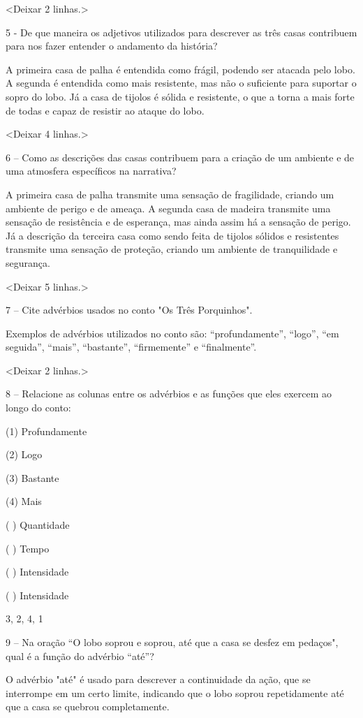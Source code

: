 \textless{}Deixar 2 linhas.\textgreater{}

5 - De que maneira os adjetivos utilizados para descrever as três casas
contribuem para nos fazer entender o andamento da história?

A primeira casa de palha é entendida como frágil, podendo ser atacada
pelo lobo. A segunda é entendida como mais resistente, mas não o
suficiente para suportar o sopro do lobo. Já a casa de tijolos é sólida
e resistente, o que a torna a mais forte de todas e capaz de resistir ao
ataque do lobo.

\textless{}Deixar 4 linhas.\textgreater{}

6 -- Como as descrições das casas contribuem para a criação de um
ambiente e de uma atmosfera específicos na narrativa?

A primeira casa de palha transmite uma sensação de fragilidade, criando
um ambiente de perigo e de ameaça. A segunda casa de madeira transmite
uma sensação de resistência e de esperança, mas ainda assim há a
sensação de perigo. Já a descrição da terceira casa como sendo feita de
tijolos sólidos e resistentes transmite uma sensação de proteção,
criando um ambiente de tranquilidade e segurança.

\textless{}Deixar 5 linhas.\textgreater{}

7 -- Cite advérbios usados no conto "Os Três Porquinhos".

Exemplos de advérbios utilizados no conto são: ``profundamente'',
``logo'', ``em seguida'', ``mais'', ``bastante'', ``firmemente'' e
``finalmente''.

\textless{}Deixar 2 linhas.\textgreater{}

8 -- Relacione as colunas entre os advérbios e as funções que eles
exercem ao longo do conto:

(1) Profundamente

(2) Logo

(3) Bastante

(4) Mais

( ) Quantidade

( ) Tempo

( ) Intensidade

( ) Intensidade

3, 2, 4, 1

9 -- Na oração ``O lobo soprou e soprou, até que a casa se desfez em
pedaços", qual é a função do advérbio ``até''?

O advérbio "até" é usado para descrever a continuidade da ação, que se
interrompe em um certo limite, indicando que o lobo soprou repetidamente
até que a casa se quebrou completamente.

